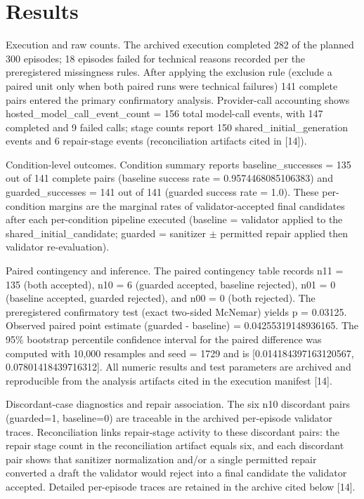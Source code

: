 \documentclass[conference]{IEEEtran}
\begin{document}
\section{Results}
Execution and raw counts. The archived execution completed 282 of the planned 300 episodes; 18 episodes failed for technical reasons recorded per the preregistered missingness rules. After applying the exclusion rule (exclude a paired unit only when both paired runs were technical failures) 141 complete pairs entered the primary confirmatory analysis. Provider-call accounting shows hosted\_model\_call\_event\_count = 156 total model-call events, with 147 completed and 9 failed calls; stage counts report 150 shared\_initial\_generation events and 6 repair-stage events (reconciliation artifacts cited in [14]).

Condition-level outcomes. Condition summary reports baseline\_successes = 135 out of 141 complete pairs (baseline success rate = 0.9574468085106383) and guarded\_successes = 141 out of 141 (guarded success rate = 1.0). These per-condition margins are the marginal rates of validator-accepted final candidates after each per-condition pipeline executed (baseline = validator applied to the shared\_initial\_candidate; guarded = sanitizer \ensuremath{\pm} permitted repair applied then validator re-evaluation).

Paired contingency and inference. The paired contingency table records n11 = 135 (both accepted), n10 = 6 (guarded accepted, baseline rejected), n01 = 0 (baseline accepted, guarded rejected), and n00 = 0 (both rejected). The preregistered confirmatory test (exact two-sided McNemar) yields p = 0.03125. Observed paired point estimate (guarded - baseline) = 0.04255319148936165. The 95\% bootstrap percentile confidence interval for the paired difference was computed with 10,000 resamples and seed = 1729 and is [0.014184397163120567, 0.07801418439716312]. All numeric results and test parameters are archived and reproducible from the analysis artifacts cited in the execution manifest [14].

Discordant-case diagnostics and repair association. The six n10 discordant pairs (guarded=1, baseline=0) are traceable in the archived per-episode validator traces. Reconciliation links repair-stage activity to these discordant pairs: the repair stage count in the reconciliation artifact equals six, and each discordant pair shows that sanitizer normalization and/or a single permitted repair converted a draft the validator would reject into a final candidate the validator accepted. Detailed per-episode traces are retained in the archive cited below [14].
\end{document}
